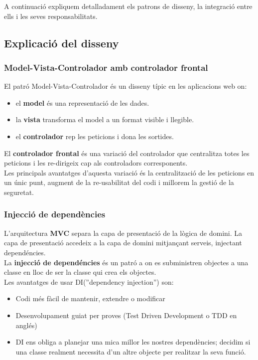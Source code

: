 A continuació expliquem detalladament els patrons de disseny, la integració entre ells i les seves responsabilitats.

\subsection{Explicaci\'{o} del disseny}
\label{subsec:dessignexplanation}

\label{mvcFrontController}
\subsubsection{Model-Vista-Controlador amb controlador frontal}
El patró Model-Vista-Controlador \'{e}s un disseny t\'{i}pic en les aplicacions web on:
\begin{itemize}
\item el \textbf{model} \'{e}s una representaci\'{o} de les dades.
\item la \textbf{vista} transforma el model a un format visible i llegible.
\item el \textbf{controlador} rep les peticions i dona les sortides.
\end{itemize}
El \textbf{controlador frontal} \'{e}s una variació del controlador que centralitza totes les peticions i les re-dirigeix cap als controladors corresponents.\\

Les principals avantatges d'aquesta variació \'{e}s la centralització de les peticions en un únic punt, augment de la re-usabilitat del codi i millorem la gestió de la seguretat.

\subsubsection{Injecció de dependències}
L'arquitectura \textbf{MVC} separa la capa de presentaci\'{o} de la l\`{o}gica de domini. La capa de presentaci\'{o} accedeix a la capa de domini mitjançant serveis, injectant depend\'{e}ncies. \\

La \textbf{injecci\'{o} de depend\'{e}ncies} \'{e}s un patr\'{o} a on es subministren objectes a una classe en lloc de ser la classe qui crea els objectes.\cite{dependency_injection}\\

Les avantatges de usar DI(''dependency injection'') son:
\begin{itemize}
\item Codi m\'{e}s f\`{a}cil de mantenir, extendre o modificar
\item Desenvolupament guiat per proves (Test Driven Development o TDD en angl\'{e}s)
\item DI ens obliga a planejar una mica millor les nostres depend\`{e}ncies; decidim si una classe realment necessita d'un altre objecte per realitzar la seva funció.
\end{itemize}

